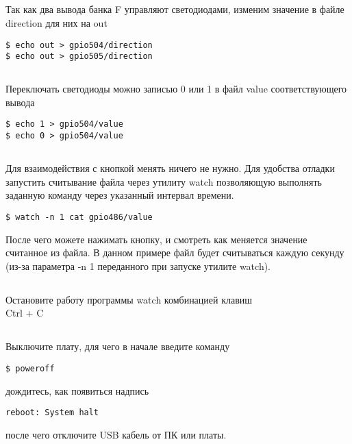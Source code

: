 \subsection{}Так как два вывода банка F управляют светодиодами, изменим значение в файле direction  для них на out
\begin{lstlisting}[style=bash]
$ echo out > gpio504/direction
$ echo out > gpio505/direction
\end{lstlisting}

\subsection{}Переключать светодиоды можно записью 0 или 1 в файл value соответствующего вывода
\begin{lstlisting}[style=bash]
$ echo 1 > gpio504/value
$ echo 0 > gpio504/value
\end{lstlisting}

\subsection{}Для взаимодействия с кнопкой менять ничего не нужно. Для удобства отладки запустить считывание файла через утилиту watch позволяющую выполнять заданную команду через указанный интервал времени.

\begin{lstlisting}[style=bash]
$ watch -n 1 cat gpio486/value
\end{lstlisting}

После чего можете нажимать кнопку, и смотреть как меняется значение считанное из файла. В данном примере файл будет считываться каждую секунду (из-за параметра -n 1 переданного при запуске утилите watch).  

\subsection{}Остановите работу программы watch комбинацией клавиш \\ Ctrl + C

\subsection{} Выключите плату, для чего в начале введите команду
\begin{lstlisting}[style=bash]
	$ poweroff
\end{lstlisting}
дождитесь, как появиться надпись
\begin{lstlisting}[style=stdout]
	reboot: System halt
\end{lstlisting}
после чего отключите USB кабель от ПК или платы. 

